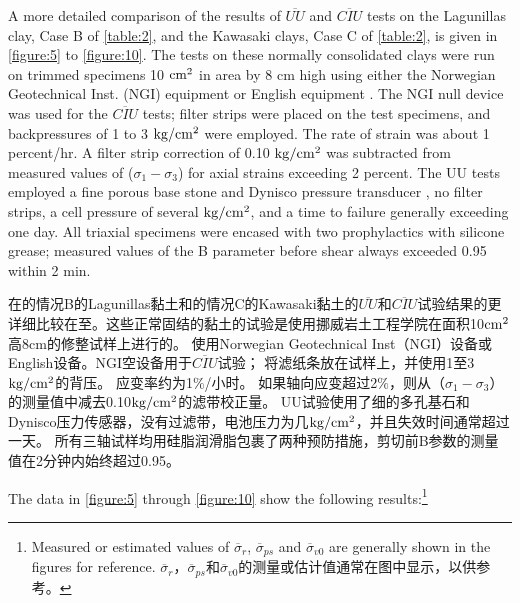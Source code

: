 \begin{paracol}{2}
    A more detailed comparison of the results of $\overline{UU}$ and $\overline{CIU}$ tests on the Lagunillas clay, Case B of \autoref{table:2}, and the Kawasaki clays, Case C of \autoref{table:2}, is given in \autoref{figure:5} to \autoref{figure:10}. The tests on these normally consolidated clays were run on trimmed specimens 10 $\rm{cm^2}$ in area by 8 cm high using either the Norwegian Geotechnical Inst. (NGI) equipment \citep{Andresen1960695} or English equipment \citep{Bishop1962}. The NGI null device was used for the $\overline{CIU}$ tests; filter strips were placed on the test specimens, and backpressures of 1 to 3 $\rm{kg/cm^2}$ were employed. The rate of strain was about 1 percent/hr. A filter strip correction of 0.10 $\rm{kg/cm^2}$ was subtracted from measured values of ($\sigma_1-\sigma_3$) for axial strains exceeding 2 percent. The UU tests employed a fine porous base stone and Dynisco pressure transducer \citep{Whitman1961407}, no filter strips, a cell pressure of several $\rm{kg/cm^2}$, and a time to failure generally exceeding one day. All triaxial specimens were encased with two prophylactics with silicone grease; measured values of the B parameter before shear always exceeded 0.95 within 2 min. 

    \switchcolumn

    在的情况B的Lagunillas黏土和的情况C的Kawasaki黏土的$\overline{UU}$和$\overline{CIU}$试验结果的更详细比较在至。这些正常固结的黏土的试验是使用挪威岩土工程学院在面积10$\rm{cm^2}$高8cm的修整试样上进行的。 使用Norwegian Geotechnical Inst（NGI）设备\citep{Andresen1960695}或English设备\citep{Bishop1962}。NGI空设备用于$\overline{CIU}$试验； 将滤纸条放在试样上，并使用1至3$\rm{kg/cm^2}$的背压。 应变率约为1$\%$/小时。 如果轴向应变超过2$\%$，则从（$\sigma_1-\sigma_3$）的测量值中减去0.10$\rm{kg/cm^2}$的滤带校正量。  UU试验使用了细的多孔基石和Dynisco压力传感器\citep{Whitman1961407}，没有过滤带，电池压力为几$\rm{kg/cm^2}$，并且失效时间通常超过一天。 所有三轴试样均用硅脂润滑脂包裹了两种预防措施，剪切前B参数的测量值在2分钟内始终超过0.95。

    
    
    
    \switchcolumn*

    The data in \autoref{figure:5} through \autoref{figure:10} show the following results:\footnote{
        Measured or estimated values of $\overline{\sigma}_r$, $\overline{\sigma}_{ps}$ and $\overline{\sigma}_{v0}$ are generally shown in the figures for reference. $\overline{\sigma}_r$，$\overline{\sigma}_{ps}$和$\overline{\sigma}_{v0}$的测量或估计值通常在图中显示，以供参考。
    }


\end{paracol}
